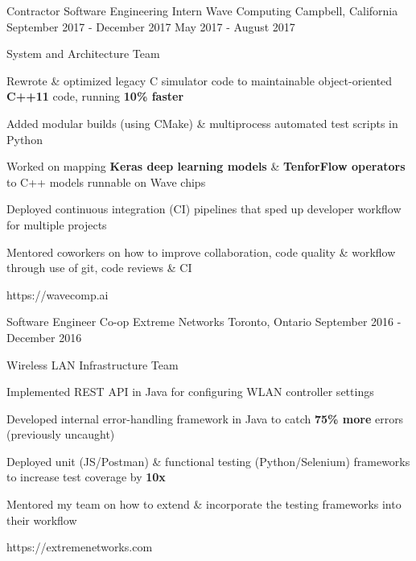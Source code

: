 


\begin{cventries}


\cventrylink
{Contractor \newline {\vspace{-.75mm}}
Software Engineering Intern}
{Wave Computing}
{Campbell, California}
{September 2017 - December 2017 \newline {\vspace{-1mm}}
May 2017 - August 2017}
{ %
System and Architecture Team
\begin{cvitems}
\item[]
\item {Rewrote \& optimized legacy C simulator code to maintainable object-oriented \textbf{C++11} code, running \textbf{10\% faster}}
\item {Added modular builds (using CMake) \& multiprocess automated test scripts in Python}
\item {Worked on mapping \textbf{Keras deep learning models} \& \textbf{TenforFlow operators} to C++ models runnable on Wave chips}
\item {Deployed continuous integration (CI) pipelines that sped up developer workflow for multiple projects }
\item {Mentored coworkers on how to improve collaboration, code quality \& workflow through use of git, code reviews \& CI}
\end{cvitems}
}
{https://wavecomp.ai}


\cventrylink
{Software Engineer Co-op}
{Extreme Networks}
{Toronto, Ontario}
{September 2016 - December 2016}
{ %
Wireless LAN Infrastructure Team
\begin{cvitems}
\item[]
\item {Implemented REST API in Java for configuring WLAN controller settings}
\item {Developed internal error-handling framework in Java to catch \textbf{75\% more} errors (previously uncaught)}
\item {Deployed unit (JS/Postman) \& functional testing (Python/Selenium) frameworks to increase test coverage by \textbf{10x}}
\item {Mentored my team on how to extend \& incorporate the testing frameworks into their workflow}
\end{cvitems}
}
{https://extremenetworks.com}


\end{cventries}
